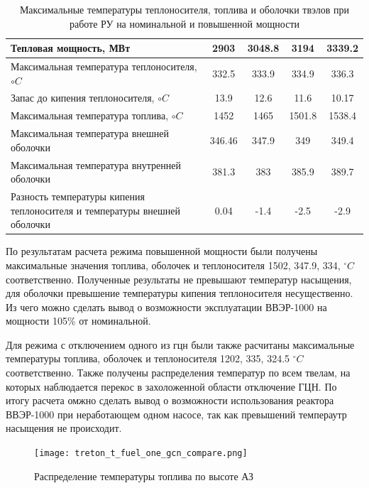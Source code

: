 \begin{table}[H]
    \caption{Максимальные температуры теплоносителя, топлива и оболочки твэлов при работе РУ на номинальной и повышенной мощности}
    \begin{center}
        \begin{tabular}{|l|c|c|c|c|}
        \toprule
        Тепловая мощность, МВт & 2903 & 3048.8 & 3194 & 3339.2 \\
        \midrule
        \hline
        Максимальная температура теплоносителя, $\circ C$ & 332.5 & 333.9 & 334.9 & 336.3  \\ 
        \hline
        Запас до кипения теплоносителя, $\circ C$ & 13.9 & 12.6 & 11.6 &  10.17 \\
        \hline
        Максимальная температура топлива, $\circ C$ & 1452 & 1465 & 1501.8 & 1538.4  \\
        \hline
        Максимальная температура внешней оболочки & 346.46 & 347.9 & 349  & 349.4 \\
        \hline
        Максимальная температура внутренней оболочки & 381.3 & 383 & 385.9 & 389.7 \\
        \hline
        Разность температуры кипения теплоносителя и температуры внешней оболочки & 0.04 & -1.4 & -2.5 & -2.9 \\
        \bottomrule
        \end{tabular}
    \end{center}
\end{table}

По результатам расчета режима повышенной мощности были получены максимальные значения топлива, оболочек и теплоносителя 1502, 347.9, 334, $^\circ C$ соответственно. Полученные результаты не превышают температур насыщения, для оболочки превышение температуры кипения теплоносителя несущественно. Из чего можно сделать вывод о возможности эксплуатации ВВЭР-1000 на мощности 105\% от номинальной.

Для режима с отключением одного из гцн были также расчитаны максимальные температуры топлива, оболочек и теплоносителя 1202, 335, 324.5 $^\circ C$ соответственно. Также получены распределения температур по всем твелам, на которых наблюдается перекос в захоложенной области отключение ГЦН. По итогу расчета омжно сделать вывод о возможности использования реактора ВВЭР-1000 при неработающем одном насосе, так как превышений темпераутр насыщения не происходит.

\begin{figure}[H]
	\begin{center}
		\texttt{[image: treton\_t\_fuel\_one\_gcn\_compare.png]}
		\caption{Распределение температуры топлива по высоте АЗ}
	\end{center}
\end{figure}

